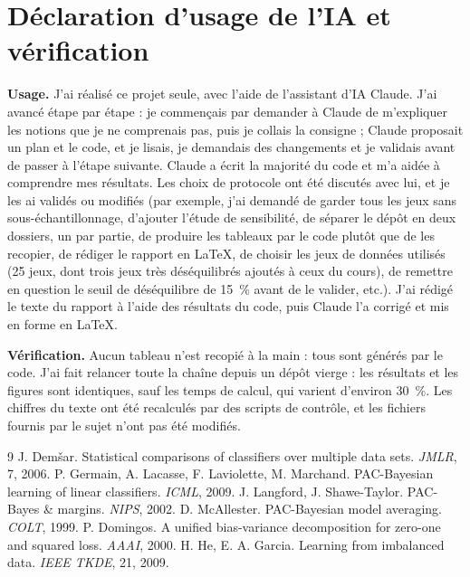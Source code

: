 \documentclass[11pt,a4paper]{article}
\begin{document}
\section*{Déclaration d'usage de l'IA et vérification}
\textbf{Usage.} J'ai réalisé ce projet seule, avec l'aide de l'assistant d'IA Claude. J'ai avancé étape par étape : je commençais par demander à Claude de m'expliquer les notions que je ne comprenais pas, puis je collais la consigne ; Claude proposait un plan et le code, et je lisais, je demandais des changements et je validais avant de passer à l'étape suivante. Claude a écrit la majorité du code et m'a aidée à comprendre mes résultats. Les choix de protocole ont été discutés avec lui, et je les ai validés ou modifiés (par exemple, j'ai demandé de garder tous les jeux sans sous-échantillonnage, d'ajouter l'étude de sensibilité, de séparer le dépôt en deux dossiers, un par partie, de produire les tableaux par le code plutôt que de les recopier, de rédiger le rapport en \LaTeX, de choisir les jeux de données utilisés (25 jeux, dont trois jeux très déséquilibrés ajoutés à ceux du cours), de remettre en question le seuil de déséquilibre de 15~\% avant de le valider, etc.). J'ai rédigé le texte du rapport à l'aide des résultats du code, puis Claude l'a corrigé et mis en forme en \LaTeX.

\textbf{Vérification.} Aucun tableau n'est recopié à la main : tous sont générés par le code. J'ai fait relancer toute la chaîne depuis un dépôt vierge : les résultats et les figures sont identiques, sauf les temps de calcul, qui varient d'environ 30~\%. Les chiffres du texte ont été recalculés par des scripts de contrôle, et les fichiers fournis par le sujet n'ont pas été modifiés.

\begin{thebibliography}{9}\small
{} J. Dem\v{s}ar. Statistical comparisons of classifiers over multiple data sets. \emph{JMLR}, 7, 2006.
 P. Germain, A. Lacasse, F. Laviolette, M. Marchand. PAC-Bayesian learning of linear classifiers. \emph{ICML}, 2009.
 J. Langford, J. Shawe-Taylor. PAC-Bayes \& margins. \emph{NIPS}, 2002.
 D. McAllester. PAC-Bayesian model averaging. \emph{COLT}, 1999.
 P. Domingos. A unified bias-variance decomposition for zero-one and squared loss. \emph{AAAI}, 2000.
 H. He, E. A. Garcia. Learning from imbalanced data. \emph{IEEE TKDE}, 21, 2009.
\end{thebibliography}

\clearpage
\appendix
\end{document}
